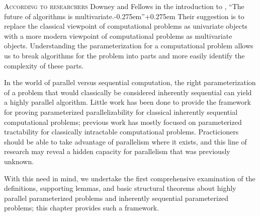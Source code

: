 %
%
%
\lettrine{A}{ccording to researchers} Downey and Fellows in the introduction to \autocite{df13}, ``The future of algorithms is multivariate.\kern-0.275em''\kern+0.275em
Their suggestion is to replace the classical viewpoint of computational problems as univariate objects with a more modern viewpoint of computational problems as multivariate objects.
Understanding the parameterization for a computational problem allows us to break algorithms for the problem into parts and more easily identify the complexity of these parts.

%
%
%
In the world of parallel versus sequential computation, the right parameterization of a problem that would classically be considered inherently sequential can yield a highly parallel algorithm.
Little work has been done to provide the framework for proving parameterized parallelizability for classical inherently sequential computational problems; previous work has mostly focused on parameterized tractability for classically intractable computational problems.
Practicioners should be able to take advantage of parallelism where it exists, and this line of research may reveal a hidden capacity for parallelism that was previously unknown.

%
%
%
With this need in mind, we undertake the first comprehensive examination of the definitions, supporting lemmas, and basic structural theorems about highly parallel parameterized problems and inherently sequential parameterized problems;
%
%
%
this chapter provides such a framework.

